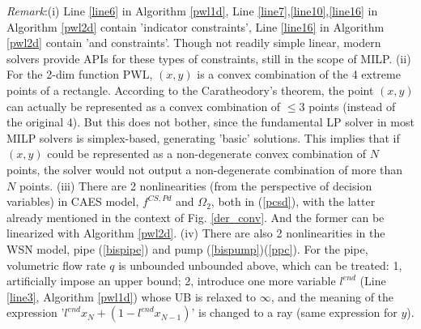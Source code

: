 \documentclass[journal,twoside,web]{ieeecolor}
\begin{document}
\textit{Remark}:(i) Line \ref{line6} in Algorithm \ref{pwl1d}, Line \ref{line7},\ref{line10},\ref{line16} in Algorithm \ref{pwl2d} contain 'indicator constraints', Line \ref{line16} in Algorithm \ref{pwl2d} contain 'and constraints'. 
Though not readily simple linear, modern solvers provide APIs for these types of constraints, still in the scope of MILP. 
(ii) For the 2-dim function PWL, $(x,y)$ is a convex combination of the 4 extreme points of a rectangle.
According to the Caratheodory's theorem, the point $(x,y)$ can actually be represented as a convex combination of $\le 3$ points (instead of the original 4). 
But this does not bother, since the fundamental LP solver in most MILP solvers is simplex-based, generating 'basic' solutions.
This implies that if $(x,y)$ could be represented as a non-degenerate convex combination of $N$ points, the solver would not output a non-degenerate combination of more than $N$ points.
(iii) There are 2 nonlinearities (from the perspective of decision variables) in CAES model, $f^{CS,Pd}$ and $\Omega_2$, both in (\ref{pcsd}), with the latter already mentioned in the context of Fig. \ref{der_conv}.
And the former can be linearized with Algorithm \ref{pwl2d}.
(iv) There are also 2 nonlinearities in the WSN model, pipe (\ref{bispipe}) and pump (\ref{bispump})(\ref{ppc}).
For the pipe, volumetric flow rate $q$ is unbounded unbounded above, which can be treated: 1, artificially impose an upper bound; 2, introduce one more variable $l^{end}$ (Line \ref{line3}, Algorithm \ref{pwl1d}) whose UB is relaxed to $\infty$, and the meaning of the expression '$l^{end}x_{N}+(1-l^{end}x_{N-1})$' is changed to a ray (same expression for $y$).





\end{document}
